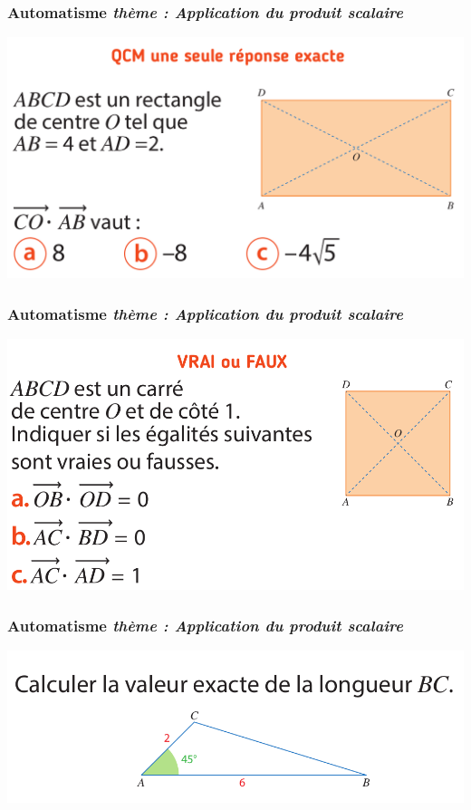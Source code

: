 \documentclass[11pt]{beamer}
\newcounter{autocompteur}
\newcommand{\automatisme}[1]{\addtocounter{autocompteur}{1}\frametitle{Automatisme  \theautocompteur  \textit{ thème : #1}}}
\begin{document}
\begin{frame}
\automatisme{Application du produit scalaire}

\begin{center}
\includegraphics[scale=0.3]{ressources/prodscal-4.png}
\end{center}


\end{frame}


\begin{frame}
\automatisme{Application du produit scalaire}

\begin{center}
\includegraphics[scale=0.3]{ressources/prodscal-5.png}
\end{center}


\end{frame}


\begin{frame}
\automatisme{Application du produit scalaire}

\begin{center}
\includegraphics[scale=0.3]{ressources/prodscal-6.png}
\end{center}


\end{frame}
\end{document}
